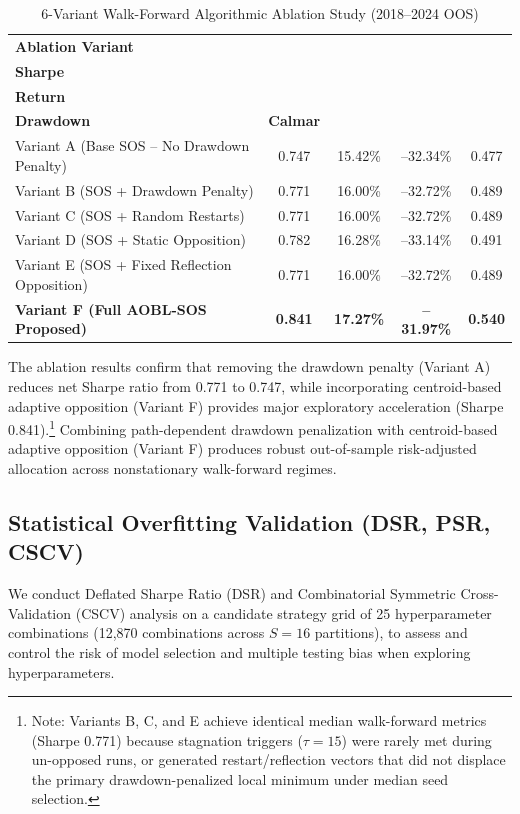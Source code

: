 \documentclass[11pt,a4paper]{article}
\begin{document}
\begin{table}[htbp]
\centering
\caption{6-Variant Walk-Forward Algorithmic Ablation Study (2018--2024 OOS)}
\label{tab:ablation}
\begin{tabular}{lcccc}
\toprule
\textbf{Ablation Variant} &
\makecell{\textbf{Net}\\\textbf{Sharpe}} &
\makecell{\textbf{Net}\\\textbf{Return}} &
\makecell{\textbf{Max}\\\textbf{Drawdown}} &
\textbf{Calmar} \\
\midrule
Variant A (Base SOS -- No Drawdown Penalty) & 0.747 & 15.42\% & --32.34\% & 0.477 \\
Variant B (SOS + Drawdown Penalty) & 0.771 & 16.00\% & --32.72\% & 0.489 \\
Variant C (SOS + Random Restarts) & 0.771 & 16.00\% & --32.72\% & 0.489 \\
Variant D (SOS + Static Opposition) & 0.782 & 16.28\% & --33.14\% & 0.491 \\
Variant E (SOS + Fixed Reflection Opposition) & 0.771 & 16.00\% & --32.72\% & 0.489 \\
\textbf{Variant F (Full AOBL-SOS Proposed)} & \textbf{0.841} & \textbf{17.27\%} & \textbf{--31.97\%} & \textbf{0.540} \\
\bottomrule
\end{tabular}
\end{table}

The ablation results confirm that removing the drawdown penalty (Variant A) reduces net Sharpe ratio from 0.771 to 0.747, while incorporating centroid-based adaptive opposition (Variant F) provides major exploratory acceleration (Sharpe 0.841).\footnote{Note: Variants B, C, and E achieve identical median walk-forward metrics (Sharpe 0.771) because stagnation triggers ($\tau=15$) were rarely met during un-opposed runs, or generated restart/reflection vectors that did not displace the primary drawdown-penalized local minimum under median seed selection.} Combining path-dependent drawdown penalization with centroid-based adaptive opposition (Variant F) produces robust out-of-sample risk-adjusted allocation across nonstationary walk-forward regimes.

\subsection{Statistical Overfitting Validation (DSR, PSR, CSCV)}
We conduct Deflated Sharpe Ratio (DSR) and Combinatorial Symmetric Cross-Validation (CSCV) analysis on a candidate strategy grid of 25 hyperparameter combinations (12,870 combinations across $S=16$ partitions), to assess and control the risk of model selection and multiple testing bias when exploring hyperparameters.
\end{document}
